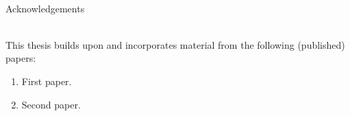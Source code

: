  \\

Acknowledgements

\newpage
{} \\

This thesis builds upon and incorporates material from the following (published) papers:

\begin{enumerate}[label={\arabic*.}]
\item First paper.
\item Second paper.
\end{enumerate} 
